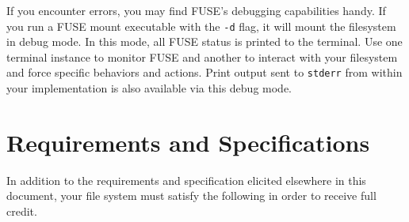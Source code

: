 \documentclass[12pt]{article}
\begin{document}
If you encounter errors, you may find FUSE's debugging capabilities
handy. If you run a FUSE mount executable with the \texttt{-d} flag, it
will mount the filesystem in debug mode. In this mode, all FUSE status
is printed to the terminal. Use one terminal instance to monitor FUSE
and another to interact with your filesystem and force specific
behaviors and actions. Print output sent to \texttt{stderr} from
within your implementation is also available via this debug mode.

\section{Requirements and Specifications}

In addition to the requirements and specification elicited elsewhere in
this document, your file system must satisfy the following in order to
receive full credit.
\end{document}
